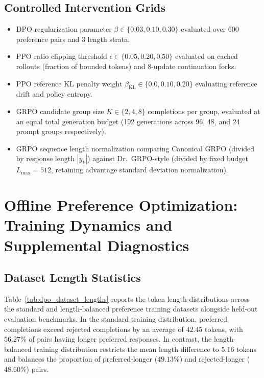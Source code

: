 \documentclass{article}
\begin{document}
\subsection{Controlled Intervention Grids}
\begin{itemize}\setlength\itemsep{-0.2em}\vspace{-2mm}
  \item DPO regularization parameter $\beta \in \{0.03, 0.10, 0.30\}$ evaluated over 600 preference pairs and 3 length strata.
  \item PPO ratio clipping threshold $\epsilon \in \{0.05, 0.20, 0.50\}$ evaluated on cached rollouts (fraction of bounded tokens) and 8-update continuation forks.
  \item PPO reference KL penalty weight $\beta_{\text{KL}} \in \{0.0, 0.10, 0.20\}$ evaluating reference drift and policy entropy.
  \item GRPO candidate group size $K \in \{2, 4, 8\}$ completions per group, evaluated at an equal total generation budget (192 generations across 96, 48, and 24 prompt groups respectively).
  \item GRPO sequence length normalization comparing Canonical GRPO (divided by response length $|y_k|$) against Dr.~GRPO-style (divided by fixed budget $L_{\max} = 512$, retaining advantage standard deviation normalization).
\end{itemize}

\clearpage
\section{Offline Preference Optimization: Training Dynamics and Supplemental Diagnostics}
\label{app:dpo_supplemental}

\subsection{Dataset Length Statistics}
Table~\ref{tab:dpo_dataset_lengths} reports the token length distributions across the standard and length-balanced preference training datasets alongside held-out evaluation benchmarks. In the standard training distribution, preferred completions exceed rejected completions by an average of $42.45$ tokens, with $56.27\%$ of pairs having longer preferred responses. In contrast, the length-balanced training distribution restricts the mean length difference to $5.16$ tokens and balances the proportion of preferred-longer ($49.13\%$) and rejected-longer ($48.60\%$) pairs.
\end{document}
